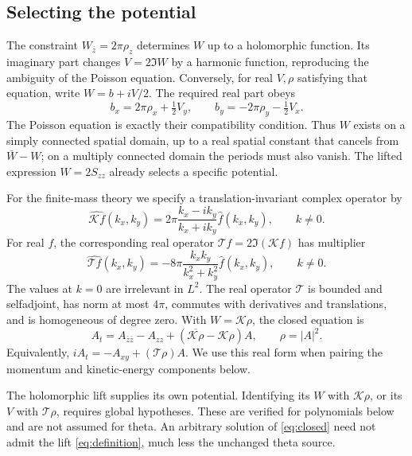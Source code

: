 \documentclass[11pt]{article}
\newcommand{\cT}{\mathcal T}
\theoremstyle{definition}
\theoremstyle{remark}
\begin{document}
\subsection{Selecting the potential}

The constraint $W_{\bar z}=2\pi\rho_z$ determines $W$ up to a
holomorphic function. Its imaginary part changes $V=2\Im W$ by a
harmonic function, reproducing the ambiguity of the Poisson equation.
Conversely, for real $V,\rho$ satisfying that equation, write
$W=b+iV/2$. The required real part obeys
\[
 b_x=2\pi\rho_x+\tfrac12V_y,\qquad
 b_y=-2\pi\rho_y-\tfrac12V_x.
\]
The Poisson equation is exactly their compatibility condition.
Thus $W$ exists on a simply connected spatial domain, up to a real
spatial constant that cancels from $\bar W-W$; on a multiply connected
domain the periods must also vanish. The lifted expression
$W=2S_{zz}$ already selects a specific potential.

For the finite-mass theory we specify a translation-invariant complex
operator by
\begin{equation}
 \widehat{\mathcal K f}(k_x,k_y)
 =2\pi\frac{k_x-ik_y}{k_x+ik_y}\widehat f(k_x,k_y),
 \qquad k\ne0.
 \label{eq:complexmultiplier}
\end{equation}
For real $f$, the corresponding real operator
$\cT f=2\Im(\mathcal Kf)$ has multiplier
\begin{equation}
 \widehat{\cT f}(k_x,k_y)
 =-8\pi\frac{k_xk_y}{k_x^2+k_y^2}\widehat f(k_x,k_y),
 \qquad k\ne0. \label{eq:multiplier}
\end{equation}
The values at $k=0$ are irrelevant in $L^2$. The real operator
$\cT$ is bounded and selfadjoint, has norm at most $4\pi$,
commutes with derivatives and translations, and is homogeneous of
degree zero. With $W=\mathcal K\rho$, the closed equation is
\begin{equation}
 A_t=A_{\bar z\bar z}-A_{zz}
   +(\overline{\mathcal K\rho}-\mathcal K\rho)A,
 \qquad\rho=|A|^2.
 \label{eq:closed}
\end{equation}
Equivalently, $iA_t=-A_{xy}+(\cT\rho)A$. We use this real form
when pairing the momentum and kinetic-energy components below.

The holomorphic lift supplies its own potential. Identifying its
$W$ with $\mathcal K\rho$, or its $V$ with $\cT\rho$, requires
global hypotheses. These are verified for polynomials below and are
not assumed for theta. An arbitrary solution of \eqref{eq:closed}
need not admit the lift \eqref{eq:definition}, much less the unchanged
theta source.
\end{document}
